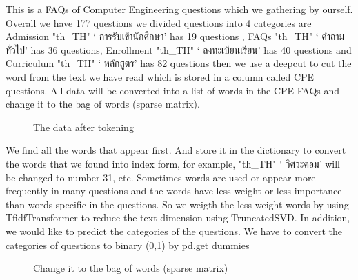 \documentclass[12pt,oneside,openright,a4paper]{cpe-english-project}
\begin{document}
This is a FAQs of Computer Engineering questions which we gathering by ourself. Overall we have 177 questions we divided questions into 4 categories are Admission{
\XeTeXlinebreaklocale "th_TH"	
\thaifont 
 ‘ การรับเข้านักศึกษา’ } has 19 questions , FAQs {
\XeTeXlinebreaklocale "th_TH"	
\thaifont 
 ‘ คำถามทั่วไป’ }has 36 questions, Enrollment {
\XeTeXlinebreaklocale "th_TH"	
\thaifont 
 ‘ ลงทะเบียนเรียน’ }has 40 questions and Curriculum {
\XeTeXlinebreaklocale "th_TH"	
\thaifont 
 ‘ หลักสูตร’ }has 82 questions then we use a deepcut to cut the word from the text we have read which is stored in a column called CPE questions. All data will be converted into a list of words in the CPE FAQs and change it to the bag of words (sparse matrix).
\begin{figure}[!h]\centering
{}
\caption{The data after tokening}\label{fig:The data after tokening}
\end{figure}
\pagebreak
We find all the words that appear first. And store it in the dictionary to convert the words that we found into index form, for example,{
\XeTeXlinebreaklocale "th_TH"	
\thaifont 
 ‘ วิศวะคอม’ } will be changed to number 31, etc.
Sometimes words  are used or appear more frequently in many questions and the words have less weight or less importance than words specific in the questions. So we weigth the less-weight words by using TfidfTransformer to reduce the text dimension using TruncatedSVD.
In addition, we would like to predict the categories of the questions. We have to convert the categories of questions to binary (0,1) by pd.get dummies
\begin{figure}[!h]\centering
{}
\caption{Change it to the bag of words (sparse matrix)}\label{fig:Change it to the bag of words (sparse matrix)}
\end{figure}
\end{document}
